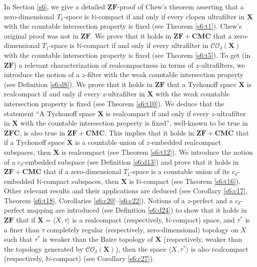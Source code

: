 \documentclass[12pt,twoside,leqno]{article}
\theoremstyle{plain}
\theoremstyle{definition}
\theoremstyle{remark}
\begin{document}
In Section \ref{s6}, we give a detailed $\mathbf{ZF}$-proof of Chew's theorem asserting that a zero-dimensional $T_1$-space is $\mathbb{N}$-compact if and only if every clopen ultrafilter in $\mathbf{X}$ with the countable intersection property is fixed (see Theorem \ref{s6:t1}). Chew's original proof was not in $\mathbf{ZF}$. We prove that it holds in $\mathbf{ZF+CMC}$ that a zero-dimensional $T_1$-space is $\mathbb{N}$-compact if and only if every ultrafilter in $\mathcal{CO}_{\delta}(\mathbf{X})$ with the countable intersection property is fixed (see Theorem \ref{s6:t5}). To get (in $\mathbf{ZF}$) a relevant characterization of realcompactness in terms of $z$-ultrafilters, we introduce the notion of a $z$-filter with the weak countable intersection property (see Definition \ref{s6:d8}). We prove that it holds in $\mathbf{ZF}$ that a Tychonoff space $\mathbf{X}$ is realcompact if and only if every $z$-ultrafilter in $\mathbf{X}$ with the weak countable intersection property is fixed (see Theorem \ref{s6:t10}). We deduce that the statement ``A Tychonoff space $\mathbf{X}$ is realcompact if and only if every $z$-ultrafilter in $\mathbf{X}$ with the countable intersection property is fixed'', well-known to be true in $\mathbf{ZFC}$, is also true in $\mathbf{ZF+CMC}$. This implies that it holds in $\mathbf{ZF+CMC}$ that if a Tychonoff space $\mathbf{X}$ is a countable union of $z$-embedded realcompact subspaces, then $\mathbf{X}$ is realcompact (see Theorem \ref{s6:t12}). We introduce the notion of a $c_{\delta}$-embedded subspace (see Definition \ref{s6:d13}) and prove that it holds in $\mathbf{ZF+CMC}$ that if a zero-dimensional $T_1$-space is a countable union of its $c_{\delta}$-embedded $\mathbb{N}$-compact subspaces, then $\mathbf{X}$ is $\mathbb{N}$-compact (see Theorem \ref{s6:t16}). Other relevant results and their applications are deduced (see Corollary \ref{s6:c17}, Theorem \ref{s6:t18}, Corollaries \ref{s6:c20}--\ref{s6:c22}). Notions of a $z$-perfect and a $c_{\delta}$-perfect mapping are introduced (see Definition \ref{s6:d24}) to show that it holds in $\mathbf{ZF}$ that if $\mathbf{X}=\langle X, \tau\rangle$ is a realcompact (respectively, $\mathbb{N}$-compact) space, and $\tau^{\ast}$ is a finer than $\tau$ completely regular (respectively, zero-dimensional) topology on $X$ such that $\tau^{\ast}$ is weaker than the Baire topology of $\mathbf{X}$ (respectively, weaker than the topology generated by $\mathcal{CO}_{\delta}(\mathbf{X})$), then the space $\langle X, \tau^{\ast}\rangle$ is also realcompact (respectively, $\mathbb{N}$-compact) (see Corollary \ref{s6:c27}).
\end{document}
